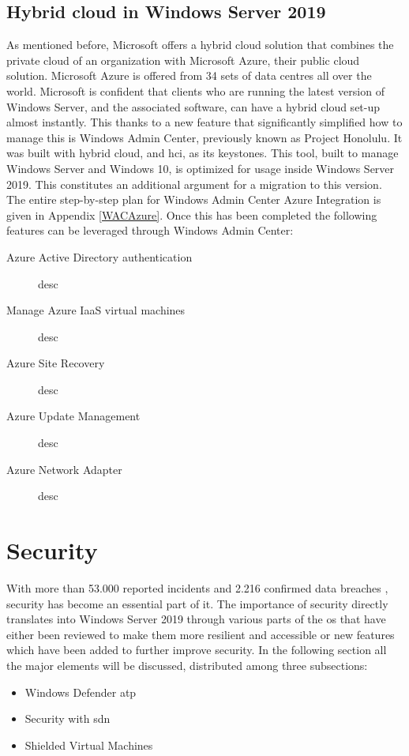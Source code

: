 \subsection{Hybrid cloud in Windows Server 2019}
\label{hybrid-cloud-windows-server-2019}
As mentioned before, Microsoft offers a hybrid cloud solution that combines the private cloud of an organization with Microsoft Azure, their public cloud solution. Microsoft Azure is offered from 34 sets of data centres all over the world. Microsoft is confident that clients who are running the latest version of Windows Server, and the associated software, can have a hybrid cloud set-up almost instantly. This thanks to a new feature that significantly simplified how to manage this is Windows Admin Center, previously known as Project Honolulu. It was built with hybrid cloud, and \acrfull{hci}, as its keystones. This tool, built to manage Windows Server and Windows 10, is optimized for usage inside Windows Server 2019. This constitutes an additional argument for a migration to this version. The entire step-by-step plan for Windows Admin Center Azure Integration is given in Appendix \ref{WACAzure}. Once this has been completed the following features can be leveraged through Windows Admin Center:
\begin{description}
\item [Azure Active Directory authentication] desc
\item [Manage Azure IaaS virtual machines] desc
\item [Azure Site Recovery] desc
\item [Azure Update Management] desc
\item [Azure Network Adapter] desc
\end{description}


\section{Security}
With more than 53.000 reported incidents and 2.216 confirmed data breaches \autocite{Verizon2018}, security has become an essential part of \acrshort{it}. The importance of security directly translates into Windows Server 2019 through various parts of the \acrshort{os} that have either been reviewed to make them more resilient and accessible or new features which have been added to further improve security. In the following section all the major elements will be discussed, distributed among three subsections:
\begin{itemize}
	\item Windows Defender \acrfull{atp}
	\item Security with \acrfull{sdn}
	\item Shielded Virtual Machines
\end{itemize}

